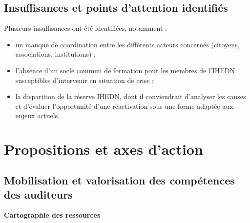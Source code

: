 \documentclass[12pt,a4paper]{article}
\begin{document}
\subsection{Insuffisances et points d'attention identifiés}

Plusieurs insuffisances ont été identifiées, notamment :

\begin{itemize}
    \item un manque de coordination entre les différents acteurs concernés (citoyens, associations, institutions) ;
    \item l'absence d'un socle commun de formation pour les membres de l'IHEDN susceptibles d'intervenir en situation de crise ;
    \item la disparition de la réserve IHEDN, dont il conviendrait d'analyser les causes et d'évaluer l'opportunité d'une réactivation sous une forme adaptée aux enjeux actuels.
\end{itemize}

\section{Propositions et axes d'action}

\subsection{Mobilisation et valorisation des compétences des auditeurs}

\textbf{Cartographie des ressources}
\end{document}
